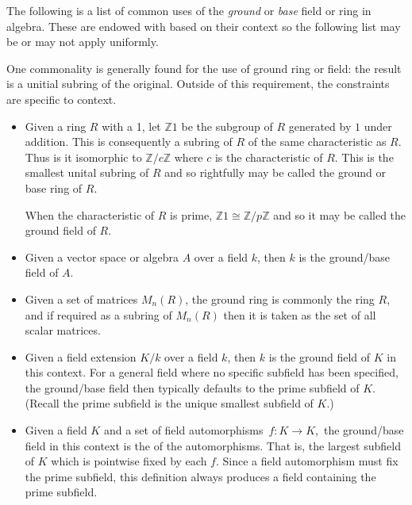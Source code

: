 \documentclass[12pt]{article}
\begin{document}
The following is a list of common uses of the  \emph{ground} or \emph{base} field or ring in algebra.  These  are endowed with  based on their context so the following list may be  or may not apply uniformly.

One commonality is generally found for the use of ground ring or field: the result is a unitial subring of the original.  Outside of this requirement, the constraints are specific to context.

\begin{itemize}
\item  Given a ring $R$ with a 1, let $\mathbb{Z}1$ be the subgroup of $R$ generated by $1$ under addition.  This is consequently a subring of $R$ of the same characteristic as $R$.  Thus is it isomorphic to $\mathbb{Z}/c\mathbb{Z}$ where $c$ is the characteristic of $R$.  This is the smallest unital subring of $R$ and so rightfully may be called the ground or base ring of $R$.

When the characteristic of $R$ is prime, $\mathbb{Z}1\cong \mathbb{Z}/p\mathbb{Z}$ and so it may be called the ground field of $R$.

\item Given a vector space or algebra $A$ over a field $k$, then $k$ is the ground/base field of $A$.  

\item Given a set of matrices $M_n(R)$, the ground ring is commonly the ring $R$, and if required as a subring of $M_n(R)$ then it is taken as the set of all scalar matrices.

\item Given a field extension $K/k$ over a field $k$, then $k$ is the ground field of $K$ in this context.  For a general field where no specific subfield has been specified, the ground/base field then typically defaults to the prime subfield of $K$.  (Recall the prime subfield is the unique smallest subfield of $K$.)

\item Given a field $K$ and a set of field automorphisms\, $f:K\rightarrow K$,\, the ground/base field in this context is the  of the automorphisms.  That is, the largest subfield of $K$ which is pointwise fixed by each $f$.  Since a field automorphism must fix the prime subfield, this definition always produces a field containing the prime subfield.

\end{itemize}

\end{document}
